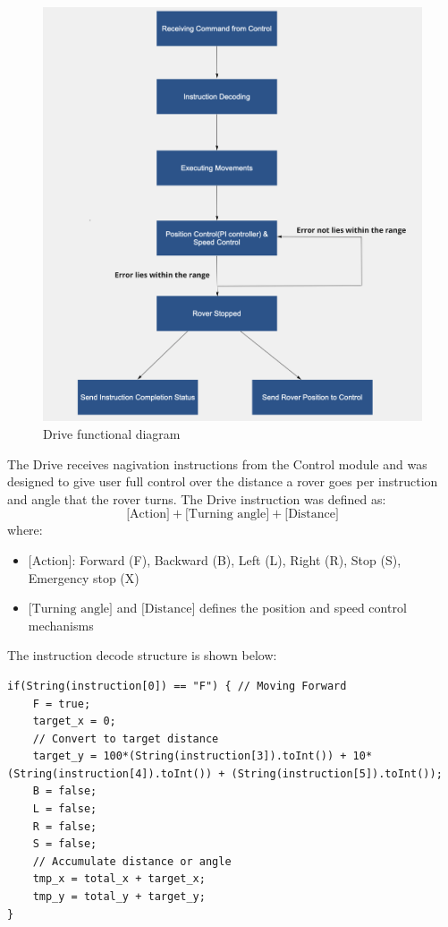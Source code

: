 \documentclass[11pt, a4paper]{article}
\begin{document}
\begin{figure} [h!]
    \centering
    \includegraphics[scale=0.3]{Drive_functional.png}
    \caption{Drive functional diagram}
\end{figure}

The Drive receives nagivation instructions from the Control module and was designed to give user full control over the distance a rover goes per instruction and angle that the rover turns. The Drive instruction was defined as:
$$
\text{[Action]} + \text{[Turning angle]} + \text{[Distance]}
$$
where:
\begin{itemize}
    \item $\text{[Action]}$: Forward (F), Backward (B), Left (L), Right (R), Stop (S), Emergency stop (X)
    \item $\text{[Turning angle]}$ and $\text{[Distance]}$ defines the position and speed control mechanisms
\end{itemize}

The instruction decode structure is shown below:
\begin{lstlisting}
if(String(instruction[0]) == "F") { // Moving Forward
    F = true;
    target_x = 0;
    // Convert to target distance
    target_y = 100*(String(instruction[3]).toInt()) + 10*(String(instruction[4]).toInt()) + (String(instruction[5]).toInt()); 
    B = false;
    L = false;
    R = false;
    S = false;
    // Accumulate distance or angle
    tmp_x = total_x + target_x;
    tmp_y = total_y + target_y;
}
\end{lstlisting}
\end{document}
